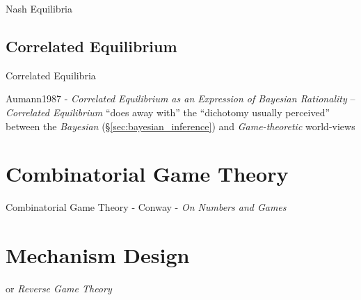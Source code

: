 Nash Equilibria



\subsection{Correlated Equilibrium}\label{sec:correlated_equilibrium}

Correlated Equilibria

Aumann1987 - \emph{Correlated Equilibrium as an Expression of Bayesian
  Rationality} -- \emph{Correlated Equilibrium} ``does away with'' the
``dichotomy usually perceived'' between the \emph{Bayesian}
(\S\ref{sec:bayesian_inference}) and \emph{Game-theoretic} world-views



\section{Combinatorial Game Theory}\label{sec:combinatorial_game_theory}

Combinatorial Game Theory - Conway  - \emph{On Numbers and Games}



\section{Mechanism Design}\label{sec:mechanism_design}

or \emph{Reverse Game Theory}
